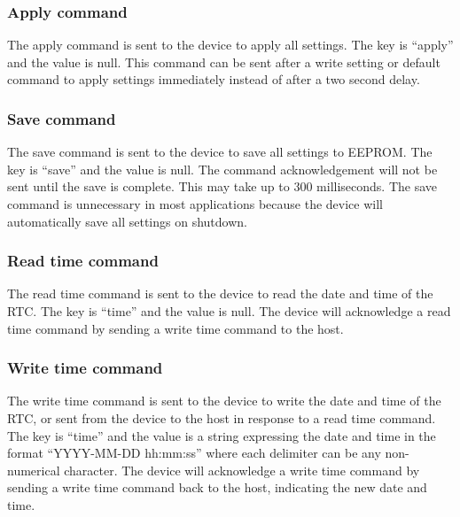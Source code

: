 
\subsubsection{Apply command}

The apply command is sent to the device to apply all settings.  The key is \enquote{apply} and the value is null.  This command can be sent after a write setting or default command to apply settings immediately instead of after a two second delay.


\subsubsection{Save command}

The save command is sent to the device to save all settings to \ac{EEPROM}.  The key is \enquote{save} and the value is null.  The command acknowledgement will not be sent until the save is complete.  This may take up to 300 milliseconds.  The save command is unnecessary in most applications because the device will automatically save all settings on shutdown.


\subsubsection{Read time command}

The read time command is sent to the device to read the date and time of the \ac{RTC}.  The key is \enquote{time} and the value is null.  The device will acknowledge a read time command by sending a write time command to the host.


\subsubsection{Write time command}

The write time command is sent to the device to write the date and time of the \ac{RTC}, or sent from the device to the host in response to a read time command.  The key is \enquote{time} and the value is a string expressing the date and time in the format \enquote{YYYY-MM-DD hh:mm:ss} where each delimiter can be any non-numerical character.  The device will acknowledge a write time command by sending a write time command back to the host, indicating the new date and time.

